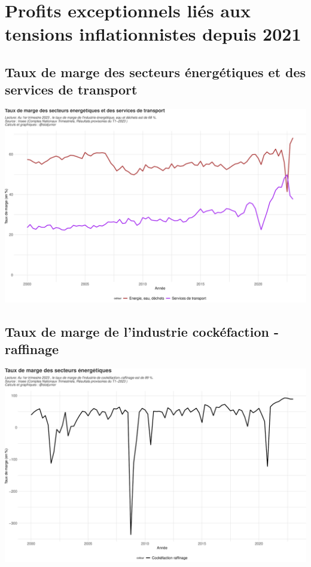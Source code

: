 \documentclass[
  paper=a4,
  ,captions=tableheading
]{scrartcl}
\begin{document}
\newpage

\hypertarget{profits-exceptionnels-liuxe9s-aux-tensions-inflationnistes-depuis-2021}{%
\section{Profits exceptionnels liés aux tensions inflationnistes depuis
2021}\label{profits-exceptionnels-liuxe9s-aux-tensions-inflationnistes-depuis-2021}}

\hypertarget{taux-de-marge-des-secteurs-uxe9nerguxe9tiques-et-des-services-de-transport}{%
\subsection{Taux de marge des secteurs énergétiques et des services de
transport}\label{taux-de-marge-des-secteurs-uxe9nerguxe9tiques-et-des-services-de-transport}}

\includegraphics{rapport_pdf_compte_branche_files/figure-latex/unnamed-chunk-25-1.pdf}

\hypertarget{taux-de-marge-de-lindustrie-cockuxe9faction---raffinage}{%
\subsection{Taux de marge de l'industrie cockéfaction -
raffinage}\label{taux-de-marge-de-lindustrie-cockuxe9faction---raffinage}}

\includegraphics{rapport_pdf_compte_branche_files/figure-latex/unnamed-chunk-27-1.pdf}
\end{document}
